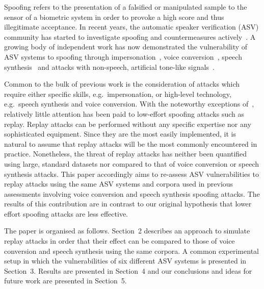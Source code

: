 Spoofing refers to the presentation of a falsified or manipulated sample 
to the sensor of a biometric system in order to provoke a high score and 
thus illegitimate acceptance.
In recent years, the automatic speaker verification (ASV) community has 
started to investigate spoofing and countermeasures 
actively~\cite{interspeechSpecialSession, handbookChapter}.  A growing 
body of independent work has now demonstrated the vulnerability of ASV 
systems to spoofing through 
impersonation~\cite{Blomberg2004,Farrus2008}, voice 
conversion~\cite{Perrot2005, Bonastre2007}, speech 
synthesis~\cite{Masuko1999, Leon2010} and attacks with non-speech, 
artificial tone-like signals~\cite{Alegre2012b}.

Common to the bulk of previous work is the consideration of attacks 
which require either specific skills, e.g.~impersonation, or high-level 
technology, e.g.~speech synthesis and voice conversion. With the 
noteworthy exceptions of~\cite{Lindberg1999,Villalba2010}, relatively 
little attention has been paid to low-effort spoofing attacks such as 
replay.  Replay attacks can be performed without any specific expertise 
nor any sophisticated equipment.  Since they are the most easily 
implemented, it is natural to assume that replay attacks will be the 
most commonly encountered in practice.  Nonetheless, the threat of 
replay attacks has neither been quantified using large, standard 
datasets nor compared to that of voice conversion or speech synthesis 
attacks.  This paper accordingly aims to re-assess ASV vulnerabilities 
to replay attacks using the same ASV systems and corpora used in 
previous assessments involving voice conversion and speech synthesis 
spoofing attacks.  The results of this contribution are in contrast to 
our original hypothesis that lower effort spoofing attacks are less 
effective.  

The paper is organised as follows.  Section~2 describes an approach to 
simulate replay attacks in order that their effect can be compared to 
those of voice conversion and speech synthesis using the same corpora. 
A common experimental setup in which the vulnerabilities of six 
different ASV systems is presented in Section~3. Results are presented 
in Section~4 and our conclusions and ideas for future work are presented 
in Section~5.
